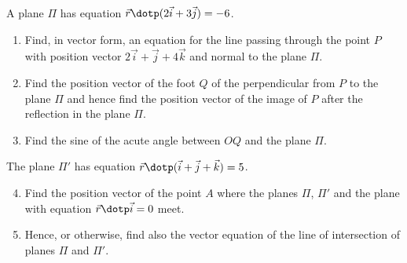 \clearpage
\begin{problem}
    A plane $\Pi$ has equation $\vec r \dotp (2\vec i + 3\vec j) = -6$.
        
    \begin{enumerate}
        \item Find, in vector form, an equation for the line passing through the point $P$ with position vector $2\vec i + \vec j + 4\vec k$ and normal to the plane $\Pi$.
        \item Find the position vector of the foot $Q$ of the perpendicular from $P$ to the plane $\Pi$ and hence find the position vector of the image of $P$ after the reflection in the plane $\Pi$.
        \item Find the sine of the acute angle between $OQ$ and the plane $\Pi$.
    \end{enumerate}

     The plane $\Pi'$ has equation $\vec r \dotp (\vec i + \vec j + \vec k) = 5$.
    
    \begin{enumerate}
        \setcounter{enumi}{3}
        \item Find the position vector of the point $A$ where the planes $\Pi$, $\Pi'$ and the plane with equation $\vec r \dotp \vec i = 0$ meet.
        \item Hence, or otherwise, find also the vector equation of the line of intersection of planes $\Pi$ and $\Pi'$.
    \end{enumerate}
\end{problem}
